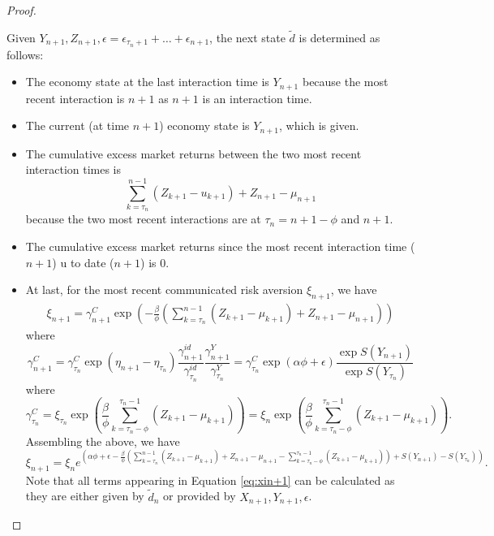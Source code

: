 \begin{proof}
\begin{enumerate}
    Given $Y_{n+1},Z_{n+1},\epsilon=\epsilon_{\tau_n+1}+\ldots+\epsilon_{n+1}$, the next state $\tilde d$ is determined as follows:\begin{itemize}
        \item The economy state at the last interaction time is $Y_{n+1}$ because the most recent interaction is $n+1$ as $n+1$ is an interaction time.
        \item The current (at time $n+1$) economy state is $Y_{n+1}$, which is given.
        \item The cumulative excess market returns between the two most recent interaction times is  $$\sum_{k=\tau_n}^{n-1}(Z_{k+1}-u_{k+1})+Z_{n+1}-\mu_{n+1}$$ because the two most recent interactions are at $\tau_n=n+1-\phi$ and $n+1$.
        \item The cumulative excess market returns since the most recent interaction time ($n+1$) u to date ($n+1$) is $0$.
        \item At last, for the most recent communicated risk aversion $\xi_{n+1}$, we have $$
        \begin{aligned}
            \xi_{n+1}=\gamma_{n+1}^C\exp\left(-\frac{\beta}{\phi}\left(\sum_{k=\tau_n}^{n-1}(Z_{k+1}-\mu_{k+1})+Z_{n+1}-\mu_{n+1}\right)\right)
        \end{aligned}
        $$ where $$\gamma_{n+1}^C=\gamma_{\tau_n}^C\exp(\eta_{n+1}-\eta_{\tau_n})\frac{\gamma_{n+1}^{id}}{\gamma_{\tau_n}^{id}}\frac{\gamma_{n+1}^{Y}}{\gamma_{\tau_n}^Y}=\gamma_{\tau_n}^C\exp(\alpha\phi+\epsilon)\frac{\exp{S(Y_{n+1})}}{\exp{S(Y_{\tau_n})}}$$
        where $$
        \gamma_{\tau_n}^C=\xi_{\tau_n}\exp\left(\frac\beta\phi\sum_{k=\tau_n-\phi}^{\tau_n-1}(Z_{k+1}-\mu_{k+1})\right)=\xi_{n}\exp\left(\frac\beta\phi\sum_{k=\tau_n-\phi}^{\tau_n-1}(Z_{k+1}-\mu_{k+1})\right).
        $$ Assembling the above, we have \begin{equation}\label{eq:xin+1}
            \xi_{n+1}=\xi_{n}e^{\left(\alpha\phi+\epsilon-\frac{\beta}{\phi}\left(\sum_{k=\tau_n}^{n-1}(Z_{k+1}-\mu_{k+1})+Z_{n+1}-\mu_{n+1}-\sum_{k=\tau_n-\phi}^{\tau_n-1}(Z_{k+1}-\mu_{k+1})\right)+S(Y_{n+1})-S(Y_{\tau_n})\right)}.
        \end{equation} Note that all terms appearing in Equation \eqref{eq:xin+1} can be calculated as they are either given by $\tilde d_n$ or provided by $X_{n+1},Y_{n+1},\epsilon$.
    \end{itemize}


\end{enumerate}
\end{proof}
